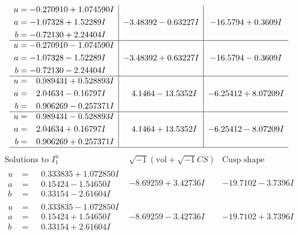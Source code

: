 \documentclass[1p]{elsarticle_modified}
\theoremstyle{definition}
\newcommand{\I}{\sqrt{-1}}
\begin{document}
$$\begin{array}{c|c|c}
\begin{aligned}
u &= -0.270910 + 1.074590 I \\
a &= -1.07328 + 1.52289 I \\
b &= -0.72130 + 2.24404 I\end{aligned}
 & -3.48392 - 0.63227 I & -16.5794 + 0.3609 I \\ \hline\begin{aligned}
u &= -0.270910 - 1.074590 I \\
a &= -1.07328 - 1.52289 I \\
b &= -0.72130 - 2.24404 I\end{aligned}
 & -3.48392 + 0.63227 I & -16.5794 - 0.3609 I \\ \hline\begin{aligned}
u &= \phantom{-}0.989431 + 0.528893 I \\
a &= \phantom{-}2.04634 - 0.16797 I \\
b &= \phantom{-}0.906269 - 0.257371 I\end{aligned}
 & \phantom{-}4.1464 - 13.5352 I & -6.25412 + 8.07209 I \\ \hline\begin{aligned}
u &= \phantom{-}0.989431 - 0.528893 I \\
a &= \phantom{-}2.04634 + 0.16797 I \\
b &= \phantom{-}0.906269 + 0.257371 I\end{aligned}
 & \phantom{-}4.1464 + 13.5352 I & -6.25412 - 8.07209 I\\
 \hline 
 \end{array}$$\newpage$$\begin{array}{c|c|c}  
\text{Solutions to }I^u_{1}& \I (\text{vol} + \sqrt{-1}CS) & \text{Cusp shape}\\
 \hline 
\begin{aligned}
u &= \phantom{-}0.333835 + 1.072850 I \\
a &= \phantom{-}0.15424 - 1.54650 I \\
b &= \phantom{-}0.33154 - 2.61604 I\end{aligned}
 & -8.69259 + 3.42736 I & -19.7102 - 3.7396 I \\ \hline\begin{aligned}
u &= \phantom{-}0.333835 - 1.072850 I \\
a &= \phantom{-}0.15424 + 1.54650 I \\
b &= \phantom{-}0.33154 + 2.61604 I\end{aligned}
 & -8.69259 - 3.42736 I & -19.7102 + 3.7396 I \\ \hline\begin{aligned}

\end{aligned}
\end{array}$$
\end{document}
